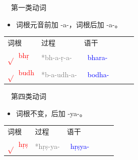 \documentclass[17pt]{beamer}
\newcommand{\skt}[1]{{\sanskritfont{#1}}} %
\newcommand{\verbroot}[1]{\textcolor{red}{$\sqrt{}$#1}}
\newcommand{\sktroot}[1]{{\verbroot{\skt{#1}}}}
\newcommand{\skttransroot}[1]{{\sktroot{#1}~\textcolor{red}{#1}}}
\newcommand{\verbstem}[1]{\textcolor{blue}{#1\nobreakdash-}}
\newcommand{\sktverbstem}[1]{{\textcolor{blue}{\skt{#1\nobreakdash-}}}}
\newcommand{\skttransverbstem}[1]{{\sktverbstem{#1}~\verbstem{#1}}}
\newcommand{\notsoimportant}[1]{\textcolor{gray}{#1}}
\newcommand{\reconstruction}[1]{\textcolor{gray}{*#1}}
\begin{document}
\begin{frame}{\insertsubsection ~~第一类动词}
  \small
  \begin{itemize}
    \item
      词根元音前加 \nobreakdash-a\nobreakdash-，词根后加 \nobreakdash-a\nobreakdash-。
  \end{itemize} 

  \centering
  \begin{tabular}{@{}llllll@{}} %
    词根 & 过程 & 语干  \\
    \skttransroot{bhṛ} & \notsoimportant{*bh-a-ṛ-a-} & \skttransverbstem{bhara}  \\
    \skttransroot{budh} & \notsoimportant{*b-a-udh-a-} & \skttransverbstem{bodha}  \\
  \end{tabular}

\end{frame}

\begin{frame}{\insertsubsection ~~第四类动词}
  \small
  \begin{itemize}
    \item
      词根不变，后加 \nobreakdash-ya\nobreakdash-。
  \end{itemize} 

  \centering
  \begin{tabular}{@{}llllll@{}} %
    词根 & 过程 & 语干  \\
    \skttransroot{hṛṣ} & \reconstruction{hṛṣ-ya-} & \skttransverbstem{hṛṣya}  \\
  \end{tabular}

\end{frame}
\end{document}
